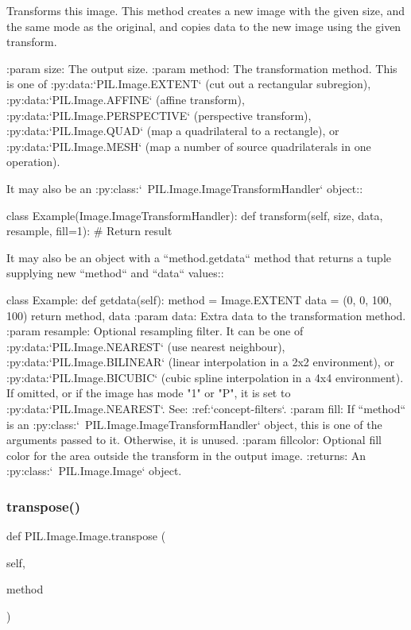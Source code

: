 \begin{DoxyVerb}Transforms this image.  This method creates a new image with the
given size, and the same mode as the original, and copies data
to the new image using the given transform.

:param size: The output size.
:param method: The transformation method.  This is one of
  :py:data:`PIL.Image.EXTENT` (cut out a rectangular subregion),
  :py:data:`PIL.Image.AFFINE` (affine transform),
  :py:data:`PIL.Image.PERSPECTIVE` (perspective transform),
  :py:data:`PIL.Image.QUAD` (map a quadrilateral to a rectangle), or
  :py:data:`PIL.Image.MESH` (map a number of source quadrilaterals
  in one operation).

  It may also be an :py:class:`~PIL.Image.ImageTransformHandler`
  object::

    class Example(Image.ImageTransformHandler):
def transform(self, size, data, resample, fill=1):
    # Return result

  It may also be an object with a ``method.getdata`` method
  that returns a tuple supplying new ``method`` and ``data`` values::

    class Example:
def getdata(self):
    method = Image.EXTENT
    data = (0, 0, 100, 100)
    return method, data
:param data: Extra data to the transformation method.
:param resample: Optional resampling filter.  It can be one of
   :py:data:`PIL.Image.NEAREST` (use nearest neighbour),
   :py:data:`PIL.Image.BILINEAR` (linear interpolation in a 2x2
   environment), or :py:data:`PIL.Image.BICUBIC` (cubic spline
   interpolation in a 4x4 environment). If omitted, or if the image
   has mode "1" or "P", it is set to :py:data:`PIL.Image.NEAREST`.
   See: :ref:`concept-filters`.
:param fill: If ``method`` is an
  :py:class:`~PIL.Image.ImageTransformHandler` object, this is one of
  the arguments passed to it. Otherwise, it is unused.
:param fillcolor: Optional fill color for the area outside the
   transform in the output image.
:returns: An :py:class:`~PIL.Image.Image` object.
\end{DoxyVerb}
 \mbox{\label{classPIL_1_1Image_1_1Image_ad00b1bf1c35d9f4308e4b5abd18fcc56}} 
\subsubsection{\texorpdfstring{transpose()}{transpose()}}
{\footnotesize\ttfamily def P\+I\+L.\+Image.\+Image.\+transpose (\begin{DoxyParamCaption}\item[{}]{self,  }\item[{}]{method }\end{DoxyParamCaption})}

